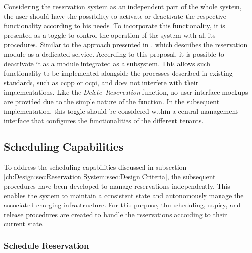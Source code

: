 Considering the reservation system as an independent part of the whole system, the user should have the possibility to activate or deactivate the respective functionality according to his needs.
To incorporate this functionality, it is presented as a toggle to control the operation of the system with all its procedures. Similar to the approach presented in \cite{orcioni_ev_2020}, which describes the reservation module as a dedicated service. According to this proposal, it is possible to deactivate it as a module integrated as a subsystem.
This allows such functionality to be implemented alongside the processes described in existing standards, such as \acrshort{ocpp} or \acrshort{ocpi}, and does not interfere with their implementations.
Like the \textit{Delete~Reservation} function, no user interface mockups are provided due to the simple nature of the function. In the subsequent implementation, this toggle should be considered within a central management interface that configures the functionalities of the different tenants. 

\newpage

\subsection{Scheduling Capabilities}
\label{ch:Design:sec:Reservation System:ssec:Scheduling Capabilities}

To address the scheduling capabilities discussed in subsection \ref{ch:Design:sec:Reservation System:ssec:Design Criteria}, the subsequent procedures have been developed to manage reservations independently.
This enables the system to maintain a consistent state and autonomously manage the associated charging infrastructure.
For this purpose, the scheduling, expiry, and release procedures are created to handle the reservations according to their current state.

\subsubsection{Schedule Reservation}
\label{ch:Design:sec:Reservation System:ssec:Scheduling Capabilities:sssec:Schedule Reservation}

